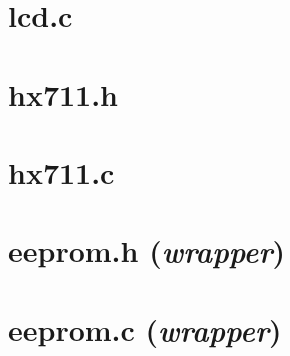 \section*{lcd.c}

\newpage
\section*{hx711.h}

\newpage
\section*{hx711.c}

\newpage
\section*{eeprom.h (\textit{wrapper})}

\newpage
\section*{eeprom.c (\textit{wrapper})}

\restoregeometry
\newpage

\newpage

%
%
%
